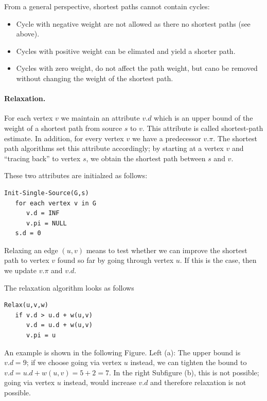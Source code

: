 From a general perspective, shortest paths cannot contain cycles:

\begin{itemize}
\item Cycle with negative weight are not allowed as there no shortest paths (see above).
\item Cycles with positive weight can be elimated and yield a shorter path.
\item Cycles with zero weight, do not affect the path weight, but cano be removed without changing the weight of the shortest path.
\end{itemize}


\paragraph{Relaxation.} 

For each vertex $v$ we maintain an attribute $v.d$ which is an upper bound of the weight of a shortest path from source $s$ to $v$. This attribute is called shortest-path estimate. In addition, for every vertex $v$ we have a predecessor $v.\pi$. The shortest path algorithms set this attribute accordingly; by starting at a vertex $v$ and ``tracing back'' to vertex $s$, we obtain the shortest path between $s$ and $v$.

These two attributes are initialzed as follows:

\begin{verbatim}
Init-Single-Source(G,s)
   for each vertex v in G
      v.d = INF
      v.pi = NULL
   s.d = 0
\end{verbatim}

Relaxing an edge $(u,v)$ means to test whether we can improve the shortest path to vertex $v$ found so far by going through vertex $u$. If this is the case, then we update $v.\pi$ and $v.d$.

The relaxation algorithm looks as follows

\begin{verbatim}
Relax(u,v,w)
   if v.d > u.d + w(u,v)
      v.d = u.d + w(u,v)
      v.pi = u 
\end{verbatim}

An example is shown in the following Figure. Left (a):  The upper bound is $v.d = 9$; if we choose going via vertex $u$ instead, we can tighten the bound to $v.d = u.d + w(u,v) = 5 + 2 = 7$. In the right Subfigure (b), this is not possible; going via vertex $u$ instead, would increase $v.d$ and therefore relaxation is not possible.   


